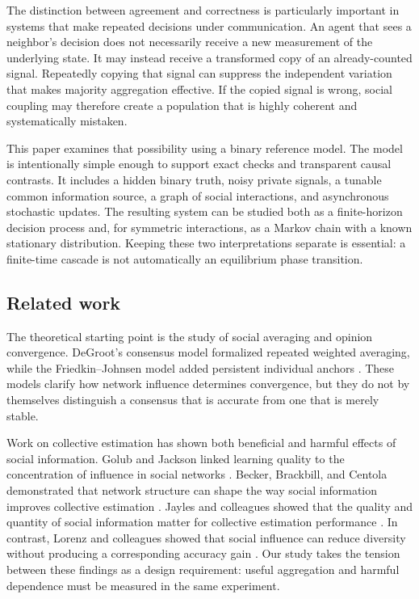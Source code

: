 \documentclass[11pt,a4paper]{article}
\begin{document}
The distinction between agreement and correctness is particularly important in systems that make repeated decisions under communication. An agent that sees a neighbor's decision does not necessarily receive a new measurement of the underlying state. It may instead receive a transformed copy of an already-counted signal. Repeatedly copying that signal can suppress the independent variation that makes majority aggregation effective. If the copied signal is wrong, social coupling may therefore create a population that is highly coherent and systematically mistaken.

This paper examines that possibility using a binary reference model. The model is intentionally simple enough to support exact checks and transparent causal contrasts. It includes a hidden binary truth, noisy private signals, a tunable common information source, a graph of social interactions, and asynchronous stochastic updates. The resulting system can be studied both as a finite-horizon decision process and, for symmetric interactions, as a Markov chain with a known stationary distribution. Keeping these two interpretations separate is essential: a finite-time cascade is not automatically an equilibrium phase transition.

\subsection{Related work}

The theoretical starting point is the study of social averaging and opinion convergence. DeGroot's consensus model formalized repeated weighted averaging, while the Friedkin--Johnsen model added persistent individual anchors \citep{degroot1974,friedkin_johnsen1990}. These models clarify how network influence determines convergence, but they do not by themselves distinguish a consensus that is accurate from one that is merely stable.

Work on collective estimation has shown both beneficial and harmful effects of social information. Golub and Jackson linked learning quality to the concentration of influence in social networks \citep{golub_jackson2010}. Becker, Brackbill, and Centola demonstrated that network structure can shape the way social information improves collective estimation \citep{becker2017}. Jayles and colleagues showed that the quality and quantity of social information matter for collective estimation performance \citep{jayles2017}. In contrast, Lorenz and colleagues showed that social influence can reduce diversity without producing a corresponding accuracy gain \citep{lorenz2011}. Our study takes the tension between these findings as a design requirement: useful aggregation and harmful dependence must be measured in the same experiment.
\end{document}
